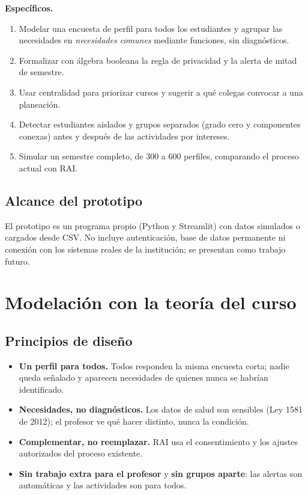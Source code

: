 \documentclass[12pt,letterpaper]{article}
\begin{document}
\textbf{Específicos.}
\begin{enumerate}
  \item Modelar una encuesta de perfil para todos los estudiantes y agrupar las necesidades en \emph{necesidades comunes} mediante funciones, sin diagnósticos.
  \item Formalizar con álgebra booleana la regla de privacidad y la alerta de mitad de semestre.
  \item Usar centralidad para priorizar cursos y sugerir a qué colegas convocar a una planeación.
  \item Detectar estudiantes aislados y grupos separados (grado cero y componentes conexas) antes y después de las actividades por intereses.
  \item Simular un semestre completo, de 300 a 600 perfiles, comparando el proceso actual con RAI.
\end{enumerate}

\subsection{Alcance del prototipo}
El prototipo es un programa propio (Python y Streamlit) con datos simulados o cargados desde CSV. No incluye autenticación, base de datos permanente ni conexión con los sistemas reales de la institución; se presentan como trabajo futuro.

\section{Modelación con la teoría del curso}\label{sec:modelo}

\subsection{Principios de diseño}
\begin{itemize}
  \item \textbf{Un perfil para todos.} Todos responden la misma encuesta corta; nadie queda señalado y aparecen necesidades de quienes nunca se habrían identificado.
  \item \textbf{Necesidades, no diagnósticos.} Los datos de salud son sensibles (Ley 1581 de 2012); el profesor ve qué hacer distinto, nunca la condición.
  \item \textbf{Complementar, no reemplazar.} RAI usa el consentimiento y los ajustes autorizados del proceso existente.
  \item \textbf{Sin trabajo extra para el profesor} y \textbf{sin grupos aparte}: las alertas son automáticas y las actividades son para todos.
\end{itemize}
\end{document}
